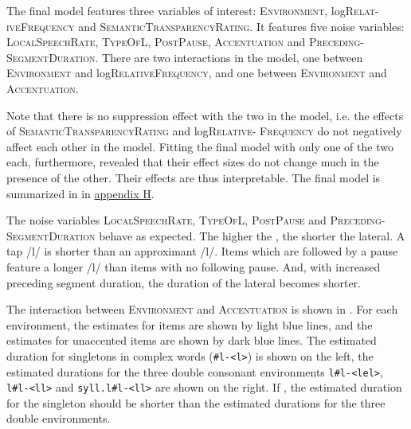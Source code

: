 The final model features three variables of interest: \textsc{Environment}, log\textsc{Relat-iveFrequency} and \textsc{SemanticTransparencyRating}. It features five noise variables: \textsc{LocalSpeechRate}, \textsc{TypeOfL}, \textsc{PostPause}, \textsc{Accentuation} and \textsc{Preceding-SegmentDuration}. 
There are two interactions in the model, one between \textsc{Environment} and log\textsc{RelativeFrequency}, and one between \textsc{Environment} and \textsc{Accentuation}. 

Note that there is no suppression effect with the two  in the model, i.e. the effects of  \textsc{SemanticTransparencyRating} and log\textsc{Relative- Frequency} do not negatively affect each other in the model. Fitting the final model with only one of the two  each, furthermore, revealed that their effect sizes do not change much in the presence of the other. Their effects are thus interpretable.
The final model is summarized in  in \hyperref[Appendix H: Model Summaries Experiment]{appendix H}.

The noise variables \textsc{LocalSpeechRate}, \textsc{TypeOfL}, \textsc{PostPause} and \textsc{Preceding- SegmentDuration} behave as expected. The higher the , the shorter the lateral. A tap /l/ is shorter than an approximant /l/. Items which are followed by a pause feature a longer /l/ than items with no following pause. And, with increased preceding segment duration, the duration of the lateral becomes shorter.



The interaction between \textsc{Environment} and \textsc{Accentuation} is shown in . 
For each environment, the estimates for  items are shown by light blue lines, and the estimates for unaccented items are shown by dark blue lines. The estimated duration for singletons in complex words (\texttt{\#l-<l>}) is shown on the left, the estimated durations for the three double consonant environments \texttt{l\#l-<lel>}, \texttt{l\#l-<ll>} and \texttt{syll.l\#l-<ll>} are shown on the right. If  , the estimated duration for the singleton should be shorter than the estimated durations for the three double environments. 


